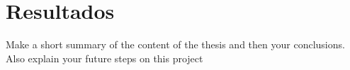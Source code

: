 \chapter*{Resultados}
\label{chapter:concl}

Make a short summary of the content of the thesis \cite{reyes2018analytical,pena-gomar2006coherent,barrera1991optical,garcia2012multiple} and then your conclusions. Also explain your future steps on this project 

\blindtext

\blindtext
